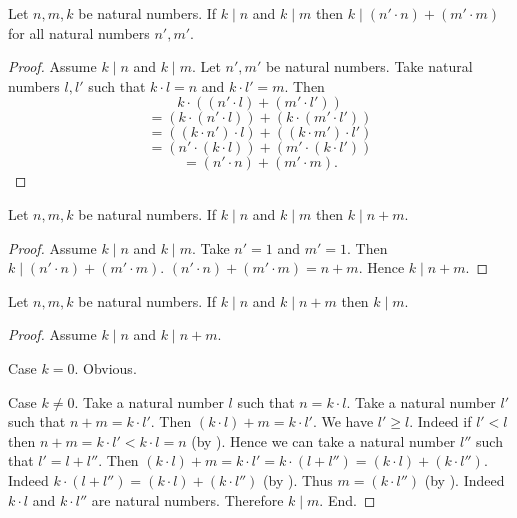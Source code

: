 \documentclass[10pt]{article}
\begin{document}
  \begin{forthel}
    \begin{proposition}[id=ARITHMETIC_07_4700711333920768,printid]
      Let $n, m, k$ be natural numbers.
      If $k \mid n$ and $k \mid m$ then $k \mid (n' \cdot n) + (m' \cdot m)$
      for all natural numbers $n', m'$.
    \end{proposition}
    \begin{proof}
      Assume $k \mid n$ and $k \mid m$.
      Let $n', m'$ be natural numbers.
      Take natural numbers $l,l'$ such that $k \cdot l = n$ and $k \cdot l' = m$.
      Then
      \[  k \cdot ((n' \cdot l) + (m' \cdot l'))                \]
      \[    = (k \cdot (n' \cdot l)) + (k \cdot (m' \cdot l'))  \]
      \[    = ((k \cdot n') \cdot l) + ((k \cdot m') \cdot l')  \]
      \[    = (n' \cdot (k \cdot l)) + (m' \cdot (k \cdot l'))  \]
      \[    = (n' \cdot n) + (m' \cdot m).                      \]
    \end{proof}
  \end{forthel}

  \begin{forthel}
    \begin{corollary}[id=ARITHMETIC_07_1556786209357824,printid]
      Let $n, m, k$ be natural numbers.
      If $k \mid n$ and $k \mid m$ then $k \mid n + m$.
    \end{corollary}
    \begin{proof}
      Assume $k \mid n$ and $k \mid m$.
      Take $n' = 1$ and $m' = 1$.
      Then $k \mid (n' \cdot n) + (m' \cdot m)$.
      $(n' \cdot n) + (m' \cdot m) = n + m$.
      Hence $k \mid n + m$.
    \end{proof}
  \end{forthel}

  \begin{forthel}
    \begin{proposition}[id=ARITHMETIC_07_1076947887063040,printid]
      Let $n, m, k$ be natural numbers.
      If $k \mid n$ and $k \mid n + m$ then $k \mid m$.
    \end{proposition}
    \begin{proof}
      Assume $k \mid n$ and $k \mid n + m$.

      Case $k = 0$. Obvious.

      Case $k \neq 0$.
        Take a natural number $l$ such that $n = k \cdot l$.
        Take a natural number $l'$ such that $n + m = k \cdot l'$.
        Then $(k \cdot l) + m = k \cdot l'$.
        We have $l' \geq l$.
        Indeed if $l' < l$ then
        $n + m
          = k \cdot l'
          < k \cdot l
          = n$ (by ).
        Hence we can take a natural number $l''$ such that $l' = l + l''$.
        Then $(k \cdot l) + m
          = k \cdot l'
          = k \cdot (l + l'')
          = (k \cdot l) + (k \cdot l'')$.
        Indeed $k \cdot (l + l'') = (k \cdot l) + (k \cdot l'')$ (by ).
        Thus $m = (k \cdot l'')$ (by ).
        Indeed $k \cdot l$ and $k \cdot l''$ are natural numbers.
        Therefore $k \mid m$.
      End.
    \end{proof}
  \end{forthel}
\end{document}
